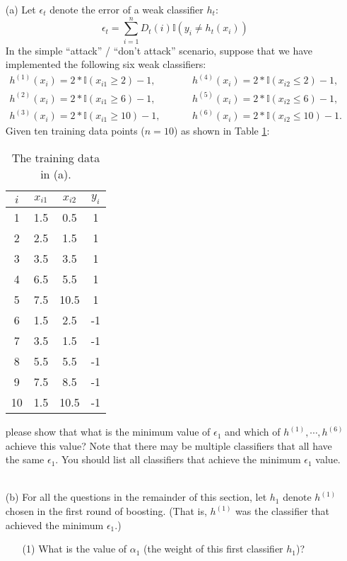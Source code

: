 \begin{itemize}
\item[(a)] Let $\epsilon_t$ denote the error of a weak classifier $h_t$:
$$\epsilon_{t} = \sum_{i=1}^{n} D_{t}(i) \mathbb{I}(y_{i} \neq h_{t}(x_{i}))$$
In the simple “attack” / “don't attack” scenario, suppose that we have implemented the following six weak classifiers:
\begin{align*}
h^{(1)}(x_{i}) = 2 * \mathbb{I}(x_{i1} \geq 2) - 1, \hspace{1cm}  & h^{(4)}(x_{i}) = 2 * \mathbb{I}(x_{i2} \leq 2) - 1,  \\
h^{(2)}(x_{i}) = 2 * \mathbb{I}(x_{i1} \geq 6) - 1, \hspace{1cm}  & h^{(5)}(x_{i}) = 2 * \mathbb{I}(x_{i2} \leq 6) - 1,  \\
h^{(3)}(x_{i}) = 2 * \mathbb{I}(x_{i1} \geq 10) - 1, \hspace{1cm} & h^{(6)}(x_{i}) = 2 * \mathbb{I}(x_{i2} \leq 10) - 1.
\end{align*}
Given ten training data points ($n = 10$) as shown in Table \ref{table1}:
\begin{table}[htbp]
    \centering
    \begin{tabular}{|c|cc|c|}
    \hline
    $i$ & $x_{i1}$ & $x_{i2}$ & $y_{i}$ \\ \hline
    1 & 1.5 & 0.5 & 1 \\
    2 & 2.5 & 1.5 & 1 \\
    3 & 3.5 & 3.5 & 1 \\
    4 & 6.5 & 5.5 & 1 \\
    5 & 7.5 & 10.5 & 1 \\
    6 & 1.5 & 2.5 & -1 \\
    7 & 3.5 & 1.5 & -1 \\
    8 & 5.5 & 5.5 & -1 \\
    9 & 7.5 & 8.5 & -1 \\
    10 & 1.5 & 10.5 & -1 \\
    \hline
    \end{tabular}
    \caption{The training data in (a).}
    \label{table1}
\end{table}

please show that what is the minimum value of $\epsilon_{1}$ and which of $h^{(1)},\cdots ,h^{(6)}$ achieve this value? Note that there may be multiple classifiers that all have the same $\epsilon_{1}$. You should list all classifiers that achieve the minimum $\epsilon_{1}$ value. ~

\item[(b)] For all the questions in the remainder of this section, let $h_{1}$ denote $h^{(1)}$ chosen in the first round of boosting. (That is, $h^{(1)}$ was the classifier that achieved the minimum $\epsilon_{1}$.)
\begin{enumerate}
    \item[(1)] What is the value of $\alpha_{1}$ (the weight of this first classifier $h_{1}$)? ~


\end{enumerate}
\end{itemize}
